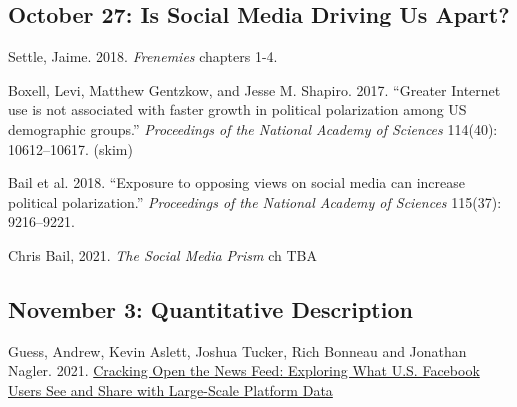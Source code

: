 \vspace{-.1in}\documentclass[11pt]{article}
\begin{document}
\subsection*{October 27: Is Social Media Driving Us Apart?}

\noindent Settle, Jaime. 2018. {\it Frenemies} chapters 1-4.

\noindent Boxell, Levi, Matthew Gentzkow, and Jesse M. Shapiro. 2017. ``Greater Internet use is not associated with faster growth in political polarization among US demographic groups.''
\emph{Proceedings of the National Academy of Sciences} 114(40): 10612--10617. (skim)


\noindent Bail et al. 2018. ``Exposure to opposing views on social media can increase political polarization.'' \emph{Proceedings of the National Academy of Sciences} 115(37): 9216--9221.

\noindent Chris Bail, 2021. \textit{The Social Media Prism} ch TBA



%
%
%
%


\subsection*{November 3: Quantitative Description}






Guess, Andrew, Kevin Aslett, Joshua Tucker, Rich Bonneau and Jonathan Nagler. 2021. \href{https://journalqd.org/article/view/2586}{Cracking Open the News Feed:	Exploring What U.S. Facebook Users See and Share with Large-Scale Platform Data}
\end{document}
